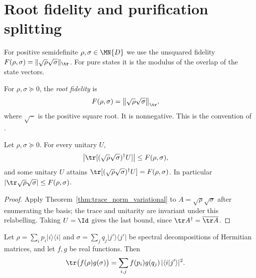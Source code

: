 \section{Root fidelity and purification splitting}

For positive semidefinite $\rho,\sigma\in\MN{D}$ we use the unsquared
fidelity $F(\rho,\sigma)=\lVert\sqrt\rho\sqrt\sigma\rVert_{\tr}$. For pure
states it is the modulus of the overlap of the state vectors.

\begin{definition}
    \label{def:root_fidelity}
    \leanok
    For $\rho,\sigma\succeq0$, the \emph{root fidelity} is
    \begin{align}
        F(\rho,\sigma)
         & =\bigl\lVert\sqrt\rho\sqrt\sigma\bigr\rVert_{\tr},
        \label{eq:root_fidelity}
    \end{align}
    where $\sqrt{\,\cdot\,}$ is the positive square root. It is
    nonnegative. This is the convention of
    \cite[Section~2]{OpenAI2026PolynomialPEPS}.
\end{definition}

\begin{theorem}
    \label{thm:root_fidelity_variational}
    \leanok
    Let $\rho,\sigma\succeq0$. For every unitary $U$,
    \begin{align}
        \bigl|\tr[(\sqrt\rho\sqrt\sigma)^\dagger U]\bigr|
         & \le F(\rho,\sigma),
        \notag
    \end{align}
    and some unitary $U$ attains
    $\tr[(\sqrt\rho\sqrt\sigma)^\dagger U]=F(\rho,\sigma)$. In particular
    $|\tr\sqrt\rho\sqrt\sigma|\le F(\rho,\sigma)$.
\end{theorem}

\begin{proof}\leanok
    Apply Theorem~\ref{thm:trace_norm_variational} to
    $A=\sqrt\rho\sqrt\sigma$ after enumerating the basis; the trace and
    unitarity are invariant under this relabelling. Taking $U=\Id$ gives
    the last bound, since $\tr A^\dagger=\overline{\tr A}$.
\end{proof}

\begin{theorem}
    \label{thm:trace_spectral_functions_double_sum}
    \leanok
    Let $\rho=\sum_ip_i|i\rangle\langle i|$ and
    $\sigma=\sum_jq_j|j'\rangle\langle j'|$ be spectral decompositions of
    Hermitian matrices, and let $f,g$ be real functions. Then
    \begin{align}
        \tr\bigl(f(\rho)g(\sigma)\bigr)
         & =\sum_{i,j}f(p_i)g(q_j)\,|\langle i|j'\rangle|^2.
        \notag
    \end{align}
\end{theorem}

